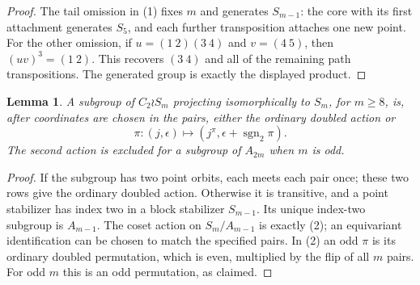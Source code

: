 \documentclass[11pt,a4paper]{article}
\newtheorem{lemma}{Lemma}
\begin{document}
\begin{proof}
The tail omission in (1) fixes $m$ and generates $S_{m-1}$:
the core with its first attachment generates $S_5$, and
each further transposition attaches one new point.
For the other omission, if $u=(1\ 2)(3\ 4)$ and
$v=(4\ 5)$, then $(uv)^3=(1\ 2)$. This recovers
$(3\ 4)$ and all of the remaining path transpositions.
The generated group is exactly the displayed product.
\end{proof}

\begin{lemma}\label{lift}
A subgroup of $C_2\wr S_m$ projecting isomorphically to
$S_m$, for $m\ge8$, is, after coordinates are chosen in
the pairs, either the ordinary doubled action or
\[
       \pi:(j,\epsilon)\longmapsto
                   (j^\pi,\epsilon+\operatorname{sgn}_2\pi).
                                                               \tag{2}
\]
The second action is excluded for a subgroup of $A_{2m}$
when $m$ is odd.
\end{lemma}
\begin{proof}
If the subgroup has two point orbits, each meets each pair
once; these two rows give the ordinary doubled action.
Otherwise it is transitive, and a point stabilizer has
index two in a block stabilizer $S_{m-1}$. Its unique
index-two subgroup is $A_{m-1}$. The coset action on
$S_m/A_{m-1}$ is exactly (2); an equivariant identification
can be chosen to match the specified pairs.
In (2) an odd $\pi$ is its ordinary doubled permutation,
which is even, multiplied by the flip of all $m$ pairs.
For odd $m$ this is an odd permutation, as claimed.
\end{proof}
\end{document}
